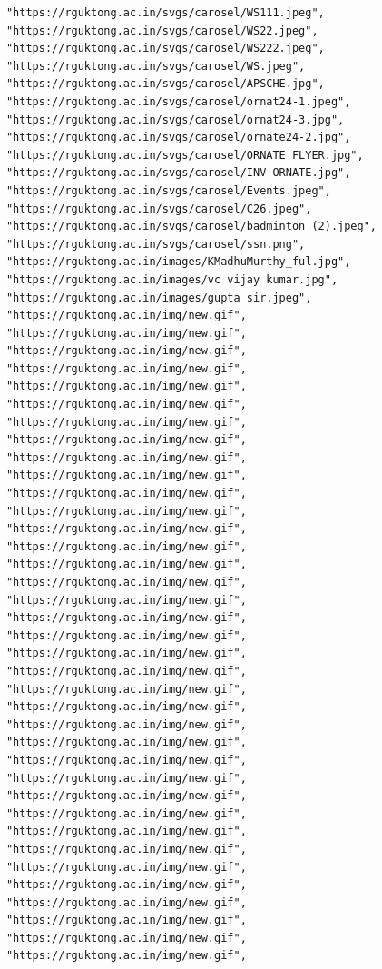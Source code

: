 \documentclass[11pt,a4paper,oneside]{article}
\begin{document}
\begin{lstlisting}
      "https://rguktong.ac.in/svgs/carosel/WS111.jpeg",
      "https://rguktong.ac.in/svgs/carosel/WS22.jpeg",
      "https://rguktong.ac.in/svgs/carosel/WS222.jpeg",
      "https://rguktong.ac.in/svgs/carosel/WS.jpeg",
      "https://rguktong.ac.in/svgs/carosel/APSCHE.jpg",
      "https://rguktong.ac.in/svgs/carosel/ornat24-1.jpeg",
      "https://rguktong.ac.in/svgs/carosel/ornat24-3.jpg",
      "https://rguktong.ac.in/svgs/carosel/ornate24-2.jpg",
      "https://rguktong.ac.in/svgs/carosel/ORNATE FLYER.jpg",
      "https://rguktong.ac.in/svgs/carosel/INV ORNATE.jpg",
      "https://rguktong.ac.in/svgs/carosel/Events.jpeg",
      "https://rguktong.ac.in/svgs/carosel/C26.jpeg",
      "https://rguktong.ac.in/svgs/carosel/badminton (2).jpeg",
      "https://rguktong.ac.in/svgs/carosel/ssn.png",
      "https://rguktong.ac.in/images/KMadhuMurthy_ful.jpg",
      "https://rguktong.ac.in/images/vc vijay kumar.jpg",
      "https://rguktong.ac.in/images/gupta sir.jpeg",
      "https://rguktong.ac.in/img/new.gif",
      "https://rguktong.ac.in/img/new.gif",
      "https://rguktong.ac.in/img/new.gif",
      "https://rguktong.ac.in/img/new.gif",
      "https://rguktong.ac.in/img/new.gif",
      "https://rguktong.ac.in/img/new.gif",
      "https://rguktong.ac.in/img/new.gif",
      "https://rguktong.ac.in/img/new.gif",
      "https://rguktong.ac.in/img/new.gif",
      "https://rguktong.ac.in/img/new.gif",
      "https://rguktong.ac.in/img/new.gif",
      "https://rguktong.ac.in/img/new.gif",
      "https://rguktong.ac.in/img/new.gif",
      "https://rguktong.ac.in/img/new.gif",
      "https://rguktong.ac.in/img/new.gif",
      "https://rguktong.ac.in/img/new.gif",
      "https://rguktong.ac.in/img/new.gif",
      "https://rguktong.ac.in/img/new.gif",
      "https://rguktong.ac.in/img/new.gif",
      "https://rguktong.ac.in/img/new.gif",
      "https://rguktong.ac.in/img/new.gif",
      "https://rguktong.ac.in/img/new.gif",
      "https://rguktong.ac.in/img/new.gif",
      "https://rguktong.ac.in/img/new.gif",
      "https://rguktong.ac.in/img/new.gif",
      "https://rguktong.ac.in/img/new.gif",
      "https://rguktong.ac.in/img/new.gif",
      "https://rguktong.ac.in/img/new.gif",
      "https://rguktong.ac.in/img/new.gif",
      "https://rguktong.ac.in/img/new.gif",
      "https://rguktong.ac.in/img/new.gif",
      "https://rguktong.ac.in/img/new.gif",
      "https://rguktong.ac.in/img/new.gif",
      "https://rguktong.ac.in/img/new.gif",
      "https://rguktong.ac.in/img/new.gif",
      "https://rguktong.ac.in/img/new.gif",
      "https://rguktong.ac.in/img/new.gif",

\end{lstlisting}
\end{document}
